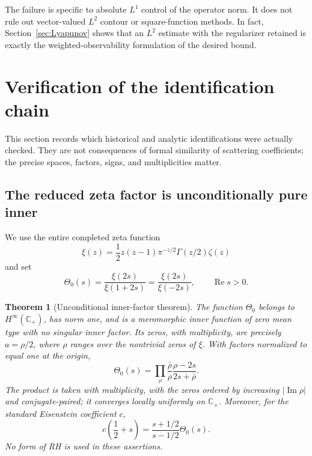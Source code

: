 \documentclass[11pt]{amsart}
\newtheorem{theorem}{Theorem}[section]
\theoremstyle{definition}
\theoremstyle{remark}
\DeclareMathOperator{\Repart}{Re}
\DeclareMathOperator{\Impart}{Im}
\newcommand{\C}{\mathbb C}
\newcommand{\abs}[1]{\left\lvert #1\right\rvert}
\begin{document}
The failure is specific to absolute $L^1$ control of the operator norm.  It
does not rule out vector-valued $L^2$ contour or square-function methods.  In
fact, Section~\ref{sec:Lyapunov} shows that an $L^2$ estimate with the
regularizer retained is exactly the weighted-observability formulation of
the desired bound.

\section{Verification of the identification chain}
\label{sec:identifications}

This section records which historical and analytic identifications were
actually checked.  They are not consequences of formal similarity of
scattering coefficients; the precise spaces, factors, signs, and
multiplicities matter.

\subsection{The reduced zeta factor is unconditionally pure inner}

We use the entire completed zeta function
\[
 \xi(z)=\frac12z(z-1)\pi^{-z/2}\Gamma(z/2)\zeta(z)
\]
and set
\begin{equation}\label{eq:theta-definition}
 \Theta_0(s)=\frac{\xi(2s)}{\xi(1+2s)}
             =\frac{\xi(2s)}{\xi(-2s)},
 \qquad \Repart s>0.
\end{equation}

\begin{theorem}[Unconditional inner-factor theorem]
\label{thm:inner}
The function $\Theta_0$ belongs to $H^\infty(\C_+)$, has norm one, and is a
meromorphic inner function of zero mean type with no singular inner factor.
Its zeros, with multiplicity, are precisely $a=\rho/2$, where $\rho$ ranges
over the nontrivial zeros of $\xi$.  With factors normalized to equal one at
the origin,
\begin{equation}\label{eq:theta-product}
 \Theta_0(s)=
 \prod_{\rho}
 \frac{\bar\rho}{\rho}\frac{\rho-2s}{2s+\bar\rho}.
\end{equation}
The product is taken with multiplicity, with the zeros ordered by increasing
$\abs{\Impart\rho}$ and conjugate-paired; it converges locally uniformly on
$\C_+$.
Moreover, for the standard Eisenstein coefficient $c$,
\begin{equation}\label{eq:c-theta}
 c\left(\frac12+s\right)
 =\frac{s+1/2}{s-1/2}\Theta_0(s).
\end{equation}
No form of RH is used in these assertions.
\end{theorem}
\end{document}
